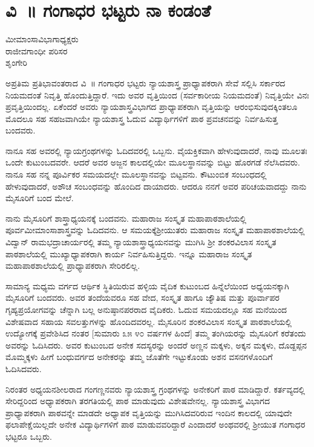 {\fontsize{14}{16}\selectfont
\chapter{ವಿ~॥ ಗಂಗಾಧರ ಭಟ್ಟರು ನಾ ಕಂಡಂತೆ}

\begin{center}
\smallskip

ಮೀಮಾಂಸಾವಿಭಾಗಾಧ್ಯಕ್ಷರು\\   
ರಾಜೀವಗಾಂಧೀ ಪರಿಸರ\\
ಶೃಂಗೇರಿ
\addrule	
\end{center}

ಅಪ್ರತಿಮ ಪ್ರತಿಭಾವಂತರಾದ ವಿ~॥ ಗಂಗಾಧರ ಭಟ್ಟರು ನ್ಯಾಯಶಾಸ್ತ್ರ ಪ್ರಾಧ್ಯಾಪಕ\-ರಾಗಿ ಸೇವೆ ಸಲ್ಲಿಸಿ ಸರ್ಕಾರದ ನಿಯಮದಂತೆ ನಿವೃತ್ತಿ ಹೊಂದುತ್ತಿದ್ದಾರೆ. ಇದು ಅವರ ವೃತ್ತಿಯಿಂದ (ಸರ್ವಕಾರೀಯ ನಿಯಮದಂತೆ) ನಿವೃತ್ತಿಯೇ ವಿನಃ ಪ್ರವೃತ್ತಿಯಿಂದಲ್ಲ. ಏಕೆಂದರೆ   \enginline{-}   ಅವರು ನ್ಯಾಯಶಾಸ್ತ್ರವಿಭಾಗದ ಪ್ರಾಧ್ಯಾಪಕರಾಗಿ ವೃತ್ತಿಯನ್ನು ಆರಂಭಿಸುವು\-ದಕ್ಕಿಂತಲೂ ಮೊದಲೂ ಸಹ ಸಹಜವಾಗಿಯೇ ನ್ಯಾಯಶಾಸ್ತ್ರ ಓದುವ ವಿದ್ಯಾರ್ಥಿಗಳಿಗೆ ಪಾಠ  \enginline{-}  ಪ್ರವಚನವನ್ನು ನಿರ್ವಹಿಸುತ್ತ ಬಂದವರು.

ನಾನೂ ಸಹ ಅವರಲ್ಲಿ ನ್ಯಾಯಗ್ರಂಥಗಳನ್ನು ಓದಿದವರಲ್ಲಿ ಒಬ್ಬನು. ವೈಯಕ್ತಿಕವಾಗಿ ಹೇಳುವುದಾದರೆ, ನಾವು ಮೂಲತಃ ಒಂದೇ ಕುಟುಂಬದವರೇ. ಆದರೆ ಅವರ ಅಜ್ಜನ ಕಾಲದಲ್ಲಿಯೇ ಮೂಲಸ್ಥಾನವನ್ನು ಬಿಟ್ಟು ಹೊರಗಡೆ ನೆಲೆಸಿದವರು. ನಾನೂ ಸಹ ನನ್ನ ಪೂರ್ವಿಕರ ಸಮಯದಲ್ಲೇ ಮೂಲಸ್ಥಾನವನ್ನು ಬಿಟ್ಟವನು. ಕೌಟುಂಬಿಕ ಸಂಬಂಧದಲ್ಲಿ ಹೇಳುವುದಾದರೆ, ಅಶೌಚ ಸಂಬಂಧವನ್ನು ಹೊಂದಿದ ದಾಯಾದರು. ಆದರೂ ನನಗೆ ಅವರ ಪರಿಚಯವಾದದ್ದು ನಾನು ಮೈಸೂರಿಗೆ ಬಂದ ಮೇಲೆ.

ನಾನು ಮೈಸೂರಿಗೆ ಶಾಸ್ತ್ರಾಧ್ಯಯನಕ್ಕೆ ಬಂದವನು. ಮಹಾರಾಜ ಸಂಸ್ಕೃತ ಮಹಾ\-ಪಾಠಶಾಲೆಯಲ್ಲಿ ಪೂರ್ವಮೀಮಾಂಸಾಶಾಸ್ತ್ರವನ್ನು ಓದಿದವನು. ಆ ಸಮಯಕ್ಕೆ\break  ಶ್ರೀಯುತರು ಮಹಾರಾಜ ಸಂಸ್ಕೃತ ಮಹಾಪಾಠಶಾಲೆಯಲ್ಲಿ ವಿದ್ವಾನ್ ರಾಮ\-ಭದ್ರಾಚಾರ್ಯರಲ್ಲಿ ತಮ್ಮ ನ್ಯಾಯಶಾಸ್ತ್ರಾಧ್ಯಯನವನ್ನು ಮುಗಿಸಿ ಶ್ರೀ ಶಂಕರವಿಲಾಸ ಸಂಸ್ಕೃತ ಪಾಠಶಾಲೆಯಲ್ಲಿ ಮುಖ್ಯಾಧ್ಯಾಪಕರಾಗಿ ಕಾರ್ಯ ನಿರ್ವಹಿಸುತ್ತಿದ್ದರು. ಇನ್ನೂ ಮಹಾರಾಜ ಸಂಸ್ಕೃತ ಮಹಾಪಾಠಶಾಲೆಯಲ್ಲಿ ಪ್ರಾಧ್ಯಾಪಕರಾಗಿ ಸೇರಿರಲಿಲ್ಲ.

ಸಾಮಾನ್ಯ ಮಧ್ಯಮ ವರ್ಗದ ಆರ್ಥಿಕ ಸ್ಥಿತಿಯಿರುವ ಹಳ್ಳಿಯ ವೈದಿಕ ಕುಟುಂಬದ ಹಿನ್ನೆಲೆಯಿಂದ ಅಧ್ಯಯನಕ್ಕಾಗಿ ಮೈಸೂರಿಗೆ ಬಂದವರು. ಅವರ ತಂದೆಯವರೂ ಸಹ ವೇದ, ಸಂಸ್ಕೃತ ಹಾಗೂ ಜ್ಯೌತಿಷ ಮತ್ತು ಪೂರ್ವಾಪರ ಗೃಹ್ಯಪ್ರಯೋಗವನ್ನು ಚೆನ್ನಾಗಿ ಬಲ್ಲ ಅನುಷ್ಠಾನಪರರಾದ ವೈದಿಕರು. ಓದುವ ಸಮಯದಲ್ಲೂ ಸಹ ಮನೆಯಿಂದ ವಿಶೇಷ\-ವಾದ ಸಹಾಯ  \enginline{-}  ಸವಲತ್ತುಗಳನ್ನು ಹೊಂದಿದವರಲ್ಲ. ಮೈಸೂರಿನ ಶಂಕರ\-ವಿಲಾಸ ಸಂಸ್ಕೃತ ಪಾಠಶಾಲೆಯಲ್ಲಿ ಉದ್ಯೋಗಕ್ಕೆ ಪ್ರವೇಶಿಸಿದ ನಂತರ [ಸುಮಾರು ೩೫  \enginline{-}  ೪೦ ವರ್ಷಗಳ ಹಿಂದೆ] ತಮ್ಮ ತಂಗಿಯರನ್ನು ಮೈಸೂರಿಗೆ ಕರೆತಂದು ಅವರನ್ನು ಓದಿಸಿದರು. ಅವರ ಕುಟುಂಬದ ಅನೇಕ ಸದಸ್ಯರನ್ನು ಅಂದರೆ ಅಣ್ಣನ ಮಕ್ಕಳು, ಅಕ್ಕನ ಮಕ್ಕಳು, ದೊಡ್ದಪ್ಪನ ಮೊಮ್ಮಕ್ಕಳು ಹೀಗೆ ಬಂಧುವರ್ಗದ ಅನೇಕರನ್ನು ತಮ್ಮ ಜೊತೆಗೇ ಇಟ್ಟುಕೊಂಡು ಅಶನ  \enginline{-}  ವಸನಗಳೊಂದಿಗೆ ಓದಿಸಿದವರು.

ನಿರಂತರ ಅಧ್ಯಯನಶೀಲರಾದ ಗಂಗಣ್ಣನವರು ನ್ಯಾಯಶಾಸ್ತ್ರ ಗ್ರಂಥಗಳನ್ನು ಅನೇಕರಿಗೆ ಪಾಠ ಮಾಡಿದ್ದಾರೆ. ಕರ್ತವ್ಯದಲ್ಲಿ ಸೇರಿದ್ದರಿಂದ ಅಧ್ಯಾಪಕರಾಗಿ ತರಗತಿಯಲ್ಲಿ ಪಾಠ ಮಾಡುವುದು ವಿಶೇಷವೇನಲ್ಲ. ನ್ಯಾಯಶಾಸ್ತ್ರ ವಿಭಾಗದ ಪ್ರಾಧ್ಯಾಪಕರಾಗಿ ಪಾಠವನ್ನೇ ಮಾಡದೇ ಅಧ್ಯಾಪಕ ವೃತ್ತಿಯನ್ನು ಮುಗಿಸಿದವರಿರುವ ಇಂದಿನ ಕಾಲದಲ್ಲಿ ಯಾವುದೇ ಫಲಾಪೇಕ್ಷೆಯಿಲ್ಲದೇ ಅನೇಕ ವಿದ್ಯಾರ್ಥಿಗಳಿಗೆ ಪಾಠ ಮಾಡುವವರಿದ್ದಾರೆ ಎಂದಾದರೆ ಅಂಥವರಲ್ಲಿ ಶ್ರೀಯುತ ಗಂಗಾಧರ ಭಟ್ಟರೂ ಒಬ್ಬರು.

}
